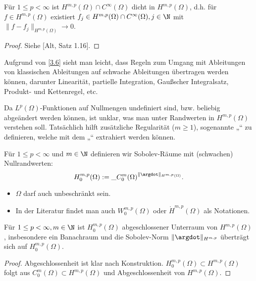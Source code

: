 \begin{st} \label{3.6}
	Für $1 \le p < \infty$ ist $H^{m,p}(\Omega) \cap C^\infty(\Omega)$ dicht in $H^{m,p}(\Omega)$, d.h. für $f \in H^{m,p}(\Omega)$ existiert $f_j \in H^{m,p}(\Omega) \cap C^\infty(\Omega), j \in \N$ mit $\|f - f_j\|_{H^{m,p}(\Omega)} \to 0$.
	\begin{proof}
		Siehe [Alt, Satz 1.16].
	\end{proof}
	\begin{note}
		Aufgrund von \ref{3.6} sieht man leicht, dass Regeln zum Umgang mit Ableitungen von klassischen Ableitungen auf schwache Ableitungen übertragen werden können,
		darunter Linearität, partielle Integration, Gaußscher Integralsatz, Produkt- und Kettenregel, etc.
	\end{note}
\end{st}

\begin{note}[Randwerte]
	Da $L^p(\Omega)$-Funktionen auf Nullmengen undefiniert sind, bzw. beliebig abgeändert werden können, ist unklar, was man unter Randwerten in $H^{m,p}(\Omega)$ verstehen soll.
	Tatsächlich hilft zusätzliche Regularität ($m \ge 1$), sogenannte „“ zu definieren, welche mit dem „“ extrahiert werden können.
\end{note}

\begin{df} \label{3.7}
	Für $1 \le p < \infty$ und $m \in \N$ definieren wir Sobolev-Räume mit (schwachen) Nullrandwerten:
	\[
		H^{m,p}_0(\Omega)
		:= \_{C_0^m(\Omega)}^{\|\argdot\|_{H^{m,p}(\Omega)}}.
	\]
	\begin{note}
		\begin{itemize}
			\item
				$\Omega$ darf auch unbeschränkt sein.
			\item
				In der Literatur findet man auch $W_0^{m,p}(\Omega)$ oder $\mathring H^{m,p}(\Omega)$ als Notationen.
		\end{itemize}
	\end{note}
\end{df}

\begin{st} \label{3.8}
	Für $1 \le p < \infty, m \in \N$ ist $H^{m,p}_0(\Omega)$ abgeschlossener Unterraum von $H^{m,p}(\Omega)$, insbesondere ein Banachraum und die Sobolev-Norm $\|\argdot\|_{H^{m,p}}$ überträgt sich auf $H_0^{m,p}(\Omega)$.
	\begin{proof}
		Abgeschlossenheit ist klar nach Konstruktion.
		$H^{m,p}_0(\Omega) \subset H^{m,p}(\Omega)$ folgt aus $C_0^m(\Omega) \subset H^{m,p}(\Omega)$ und Abgeschlossenheit von $H^{m,p}(\Omega)$.
	\end{proof}
\end{st}

